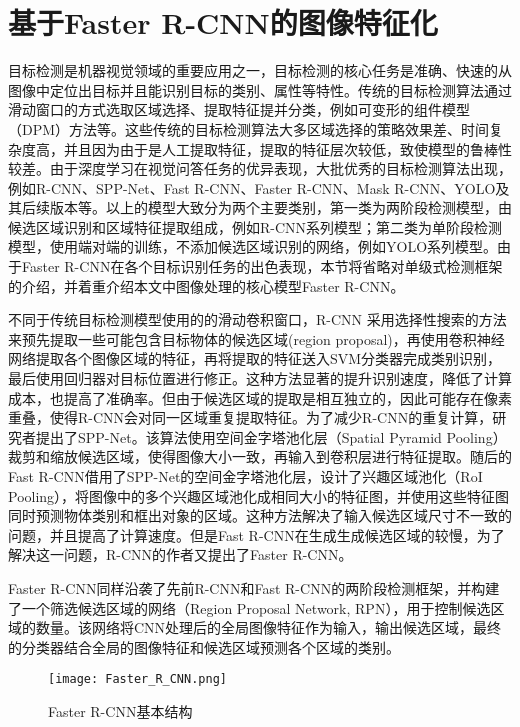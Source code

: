 \section{基于Faster R-CNN的图像特征化}
目标检测是机器视觉领域的重要应用之一，目标检测的核心任务是准确、快速的从图像中定位出目标并且能识别目标的类别、属性等特性。传统的目标检测算法通过滑动窗口的方式选取区域选择、提取特征提并分类，例如可变形的组件模型（DPM）方法等。这些传统的目标检测算法大多区域选择的策略效果差、时间复杂度高，并且因为由于是人工提取特征，提取的特征层次较低，致使模型的鲁棒性较差。由于深度学习在视觉问答任务的优异表现，大批优秀的目标检测算法出现，例如R-CNN、SPP-Net、Fast R-CNN、Faster R-CNN、Mask R-CNN、YOLO及其后续版本等。以上的模型大致分为两个主要类别，第一类为两阶段检测模型，由候选区域识别和区域特征提取组成，例如R-CNN系列模型；第二类为单阶段检测模型，使用端对端的训练，不添加候选区域识别的网络，例如YOLO系列模型。由于Faster R-CNN在各个目标识别任务的出色表现，本节将省略对单级式检测框架的介绍，并着重介绍本文中图像处理的核心模型Faster R-CNN。

不同于传统目标检测模型使用的的滑动卷积窗口，R-CNN 采用选择性搜索的方法来预先提取一些可能包含目标物体的候选区域(region proposal)，再使用卷积神经网络提取各个图像区域的特征，再将提取的特征送入SVM分类器完成类别识别，最后使用回归器对目标位置进行修正。这种方法显著的提升识别速度，降低了计算成本，也提高了准确率。但由于候选区域的提取是相互独立的，因此可能存在像素重叠，使得R-CNN会对同一区域重复提取特征。为了减少R-CNN的重复计算，研究者提出了SPP-Net。该算法使用空间金字塔池化层（Spatial Pyramid Pooling）裁剪和缩放候选区域，使得图像大小一致，再输入到卷积层进行特征提取。随后的Fast R-CNN借用了SPP-Net的空间金字塔池化层，设计了兴趣区域池化（RoI Pooling），将图像中的多个兴趣区域池化成相同大小的特征图，并使用这些特征图同时预测物体类别和框出对象的区域。这种方法解决了输入候选区域尺寸不一致的问题，并且提高了计算速度。但是Fast R-CNN在生成生成候选区域的较慢，为了解决这一问题，R-CNN的作者又提出了Faster R-CNN。

Faster R-CNN同样沿袭了先前R-CNN和Fast R-CNN的两阶段检测框架，并构建了一个筛选候选区域的网络（Region Proposal Network, RPN），用于控制候选区域的数量。该网络将CNN处理后的全局图像特征作为输入，输出候选区域，最终的分类器结合全局的图像特征和候选区域预测各个区域的类别。
\begin{figure}[H]
	\texttt{[image: Faster\_R\_CNN.png]}
	\caption{Faster R-CNN基本结构}
	\label{Faster_R_CNN}
\end{figure}

